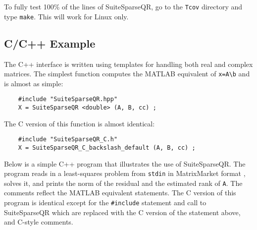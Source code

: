 \documentclass[12pt]{article}
\begin{document}
To fully test 100\% of the lines of SuiteSparseQR, go to the \verb'Tcov'
directory and type \verb'make'.  This will work for Linux only.

\subsection{C/C++ Example}

The C++ interface is written using templates for handling both real and complex
matrices.  The simplest function computes the MATLAB equivalent of
\verb'x=A\b' and is almost as simple:
{\footnotesize
\begin{verbatim}
    #include "SuiteSparseQR.hpp"
    X = SuiteSparseQR <double> (A, B, cc) ;
\end{verbatim}
}
The C version of this function is almost identical:
{\footnotesize
\begin{verbatim}
    #include "SuiteSparseQR_C.h"
    X = SuiteSparseQR_C_backslash_default (A, B, cc) ;
\end{verbatim}
}

Below is a simple C++ program that illustrates the use of SuiteSparseQR.  The
program reads in a least-squares problem from \verb'stdin' in MatrixMarket
format \cite{BoisvertPozoRemingtonBarrettDongarra97}, solves it, and prints the
norm of the residual and the estimated rank of \verb'A'.  The comments reflect
the MATLAB equivalent statements.  The C version of this program is identical
except for the \verb'#include' statement and call to SuiteSparseQR which are
replaced with the C version of the statement above, and C-style comments.
\end{document}
